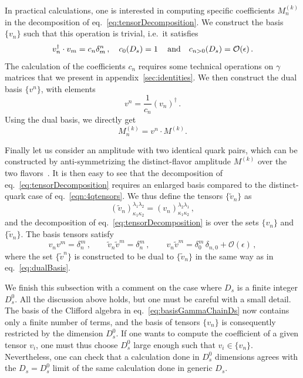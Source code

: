 In practical calculations, one is interested in computing
specific coefficients $M^{(k)}_n$ in the decomposition
of eq.~\eqref{eq:tensorDecomposition}. We construct the
basis $\{v_n\}$ such that this operation is trivial, i.e.\  it
satisfies
\begin{equation}\label{eqn:vnproducts}
	v_n^\dagger\cdot v_m=c_n\delta^n_m\,,
	\quad
    c_0(D_s) = 1\,\quad\mbox{and}\quad  c_{n>0}(D_s)={\cal O}(\epsilon)\,.
\end{equation}
The calculation of the coefficients $c_n$ requires some 
technical operations on $\gamma$ matrices that we present in
appendix~\ref{sec:identities}.
We then construct the dual basis $\{v^n\}$, with elements
\begin{equation}\label{eq:dualBasis}
	v^n=\frac{1}{c_n} (v_n)^\dagger\,.
\end{equation}
Using the dual basis, we directly get
\begin{equation}\label{eqn:helampl}
  M^{(k)}_n = v^n \cdot M^{(k)}.
\end{equation}

Finally let us consider an amplitude with two identical quark
pairs, which can be constructed by anti-symmetrizing the
distinct-flavor amplitude $M^{(k)}$ over the two
flavors~\cite{DeFreitas:2004kmi,Glover:2004si}.
It is then easy to see that the decomposition of
eq.~\eqref{eq:tensorDecomposition} requires an enlarged basis
compared to the distinct-quark case of
eq.~\eqref{eqn:4qtensors}. We thus define the tensors
$\{\tilde v_n\}$ as
\begin{equation}\label{eq:basisIdentical}
	(\tilde v_n)_{\kappa_1\kappa_2}^{\lambda_1\lambda_2}=
	(v_n)_{\kappa_1\kappa_2}^{\lambda_2\lambda_1}\,,
\end{equation}
and the decomposition of eq.~\eqref{eq:tensorDecomposition}
is over the sets $\{v_n\}$ and $\{\tilde v_n\}$.
The basis tensors satisfy
\begin{equation}\label{eq:dualBasisIdentical}
	v_nv^m=\delta^m_n\,,\qquad
	\tilde v_n\tilde v^m=\delta^m_n\,,\qquad
	v_n\tilde v^m=
	\delta^m_0\,\delta_{n,0}+\mathcal{O}(\epsilon)\,,
\end{equation}
where the set $\{\tilde v^n\}$ is constructed to be dual to
$\{\tilde v_n\}$ in the same way as in 
eq.~\eqref{eq:dualBasis}.

We finish this subsection with a comment on the case where $D_s$
is a finite integer $D_s^0$. 
All the discussion above holds, but one
must be careful with a small detail. 
The basis of the Clifford algebra in 
eq.~\eqref{eq:basisGammaChainDs} now contains only a finite 
number of terms, and the basis of tensors $\{v_n\}$ is
consequently restricted by the dimension $D^0_s$. 
If one wants to compute the coefficient of a given tensor 
$v_i$, one must thus choose $D_s^0$ large enough such
that $v_i \in \{v_n\}$. Nevertheless, one can check that a 
calculation done in $D_s^0$ dimensions agrees 
with the $D_s=D_s^0$ limit of the same calculation done in
generic $D_s$.


